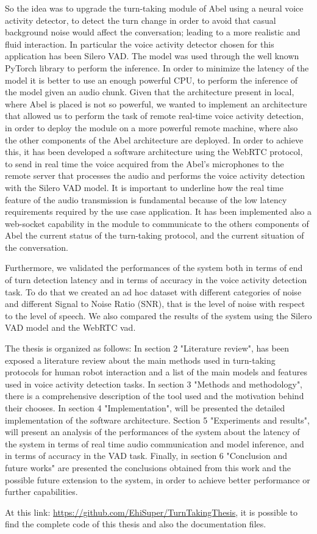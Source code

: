 \documentclass[../main.tex]{subfiles}
\begin{document}
So the idea was to upgrade the turn-taking module of Abel using a neural voice activity detector, to detect the turn change in order to avoid that casual background noise would affect the conversation; leading to a more realistic and fluid interaction. In particular the voice activity detector chosen for this application has been Silero VAD. The model was used through the well known PyTorch library to perform the inference. In order to minimize the latency of the model it is better to use an enough powerful CPU, to perform the inference of the model given an audio chunk. Given that the architecture present in local, where Abel is placed is not so powerful, we wanted to implement an architecture that allowed us to perform the task of remote real-time voice activity detection, in order to deploy the module on a more powerful remote machine, where also the other components of the Abel architecture are deployed. In order to achieve this, it has been developed a software architecture using the WebRTC protocol, to send in real time the voice acquired from the Abel's microphones to the remote server that processes the audio and performs the voice activity detection with the Silero VAD model. It is important to underline how the real time feature of the audio transmission is fundamental because of the low latency requirements required by the use case application. It has been implemented also a web-socket capability in the module to communicate to the others components of Abel the current status of the turn-taking protocol, and the current situation of the conversation.

Furthermore, we validated the performances of the system both in terms of end of turn detection latency and in terms of accuracy in the voice activity detection task. To do that we created an ad hoc dataset with different categories of noise and different Signal to Noise Ratio (SNR), that is the level of noise with respect to the level of speech. We also compared the results of the system using the Silero VAD model and the WebRTC vad. 

The thesis is organized as follows:
In section 2 "Literature review", has been exposed a literature review about the main methods used in turn-taking protocols for human robot interaction and a list of the main models and features used in voice activity detection tasks. In section 3 "Methods and methodology", there is a comprehensive description of the tool used and the motivation behind their chooses. In section 4 "Implementation", will be presented the detailed implementation of the software architecture. Section 5 "Experiments and results", will present an analysis of the performances of the system about the latency of the system in terms of real time audio communication and model inference, and in terms of accuracy in the VAD task. Finally, in section 6 "Conclusion and future works" are presented the conclusions obtained from this work and the possible future extension to the system, in order to achieve better performance or further capabilities.

At this link: \url{https://github.com/EhiSuper/TurnTakingThesis}, it is possible to find the complete code of this thesis and also the documentation files.
\end{document}
